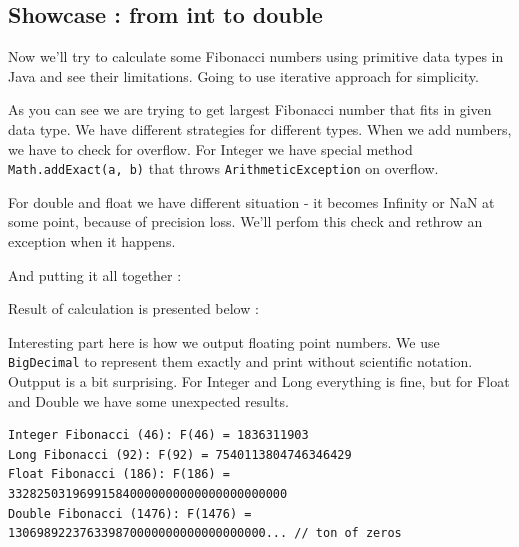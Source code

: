 \documentclass{article}
\begin{document}
\subsection{Showcase : from int to double}
Now we'll try to calculate some Fibonacci numbers using primitive data types in Java and see their limitations. Going to use iterative approach for simplicity.

As you can see we are trying to get largest Fibonacci number that fits in given data type. We have different strategies for different types.
When we add numbers, we have to check for overflow. For Integer we have special method \texttt{Math.addExact(a, b)} that throws \texttt{ArithmeticException} on overflow.

For double and float we have different situation - it becomes Infinity or NaN at some point, because of precision loss. We'll perfom this check and rethrow an exception when it happens.

And putting it all together :

Result of calculation is presented below :

Interesting part here is how we output floating point numbers. We use \texttt{BigDecimal} to represent them exactly and print without scientific notation.
Outpput is a bit surprising. For Integer and Long everything is fine, but for Float and Double we have some unexpected results.
\begin{verbatim}
Integer Fibonacci (46): F(46) = 1836311903
Long Fibonacci (92): F(92) = 7540113804746346429
Float Fibonacci (186): F(186) = 332825031969915840000000000000000000000
Double Fibonacci (1476): F(1476) = 130698922376339870000000000000000000... // ton of zeros
\end{verbatim}
\end{document}
